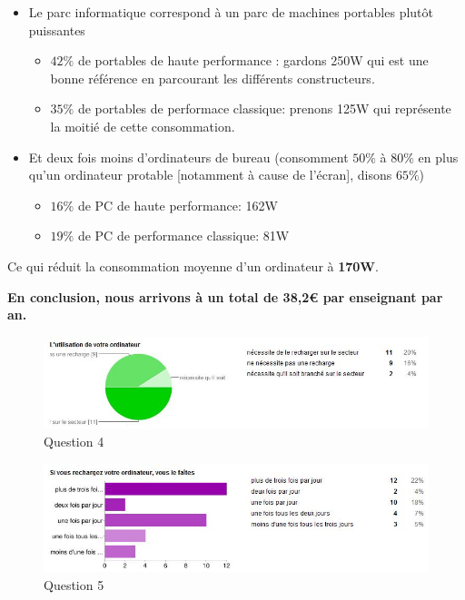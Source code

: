 \documentclass[a4paper,11pt,french]{article}
\begin{document}
\begin{itemize}
\item Le parc informatique correspond à un parc de machines portables plutôt puissantes
  \begin{itemize}
  \item $42\%$ de portables de haute performance : gardons 250W qui est une bonne référence en parcourant les différents constructeurs.
  \item $35\%$ de portables de performace classique: prenons 125W qui représente la moitié de cette consommation.  
  \end{itemize} 
\item Et deux fois moins d'ordinateurs de bureau (consomment $50\%$ à $80\%$ en plus qu'un ordinateur protable [notamment à cause de l'écran], disons $65\%$)
  \begin{itemize}
  \item $16\%$ de PC de haute performance: 162W
  \item $19\%$ de PC de performance classique: 81W
  \end{itemize} 
\end{itemize}

Ce qui réduit la consommation moyenne d'un ordinateur à \textbf{170W}.\\
\begin{center}
\textbf{En conclusion, nous arrivons à un total de 38,2\euro{} par enseignant par an.}
\end{center}

\begin{figure}[h!]
\includegraphics[width=\textwidth]{i9.JPG}
\caption{Question 4}
\label{i9}
\end{figure}

\begin{figure}[h!]
\includegraphics[width=\textwidth]{i10.JPG}
\caption{Question 5}
\label{i10}
\end{figure}
\end{document}
